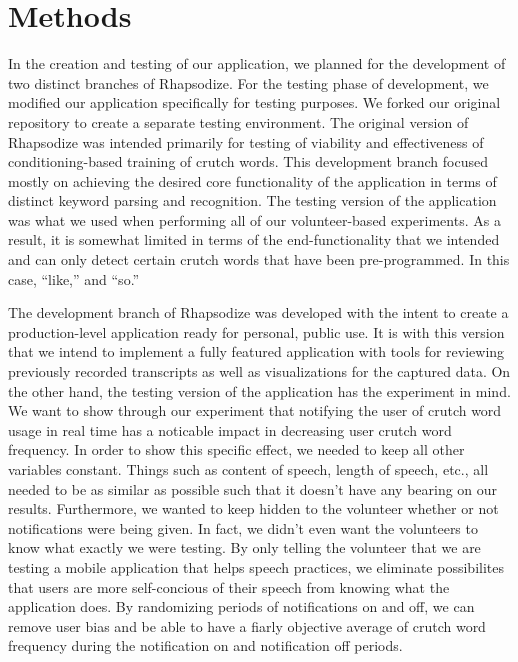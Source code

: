 \documentclass{sigchi}
\begin{document}
\section{Methods}

In the creation and testing of our application, we planned for the development of two distinct branches of Rhapsodize. For the testing phase of development, we modified our application specifically for testing purposes. We forked our original repository to create a separate testing environment. The original version of Rhapsodize was intended primarily for testing of viability and effectiveness of conditioning-based training of crutch words. This development branch focused mostly on achieving the desired core functionality of the application in terms of distinct keyword parsing and recognition. The testing version of the application was what we used when performing all of our volunteer-based experiments. As a result, it is somewhat limited in terms of the end-functionality that we intended and can only detect certain crutch words that have been pre-programmed. In this case, ``like,'' and ``so.''

The development branch of Rhapsodize was developed with the intent to create a production-level application ready for personal, public use. It is with this version that we intend to implement a fully featured application with tools for reviewing previously recorded transcripts as well as visualizations for the captured data. On the other hand, the testing version of the application has the experiment in mind. We want to show through our experiment that notifying the user of crutch word usage in real time has a noticable impact in decreasing user crutch word frequency. In order to show this specific effect, we needed to keep all other variables constant. Things such as content of speech, length of speech, etc., all needed to be as similar as possible such that it doesn't have any bearing on our results. Furthermore, we wanted to keep hidden to the volunteer whether or not notifications were being given. In fact, we didn't even want the volunteers to know what exactly we were testing. By only telling the volunteer that we are testing a mobile application that helps speech practices, we eliminate possibilites that users are more self-concious of their speech from knowing what the application does. By randomizing periods of notifications on and off, we can remove user bias and be able to have a fiarly objective average of crutch word frequency during the notification on and notification off periods.
\end{document}
